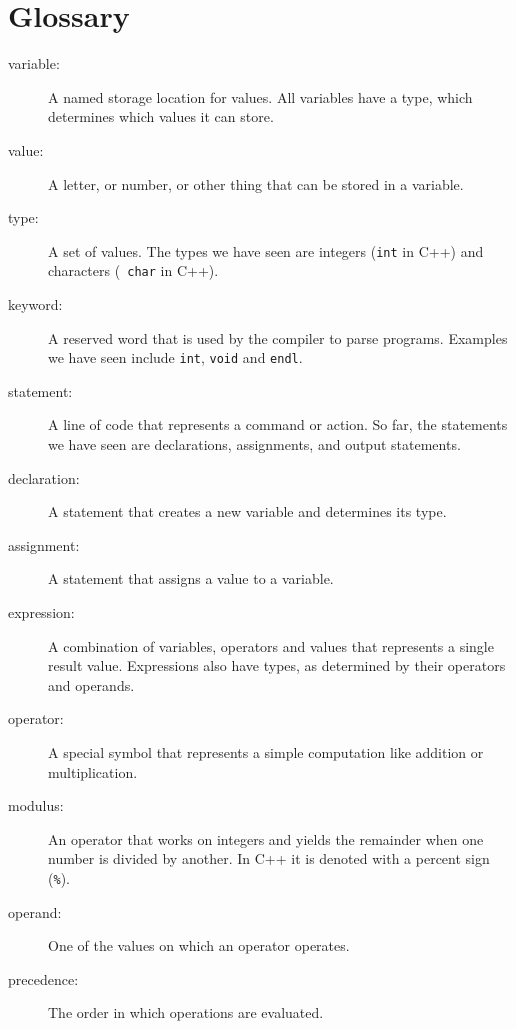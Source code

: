 \section{Glossary}
\begin{description}

\item[variable:] A named storage location for values.  All
variables have a type, which determines which values it can
store.

\item[value:] A letter, or number, or other thing that can be
stored in a variable.  

\item[type:] A set of values.  The types
we have seen are integers ({\tt int} in C++) and characters ({\tt
char} in C++).

\item[keyword:]  A reserved word that is used by the compiler
to parse programs.  Examples we have seen include {\tt int},
{\tt void} and {\tt endl}.

\item[statement:] A line of code that represents a command or
action.  So far, the statements we have seen are declarations,
assignments, and output statements.

\item[declaration:] A statement that creates a new variable and
determines its type.

\item[assignment:] A statement that assigns a value to a variable.

\item[expression:] A combination of variables, operators and
values that represents a single result value.  Expressions also
have types, as determined by their operators and operands.

\item[operator:] A special symbol that represents a simple
computation like addition or multiplication.

\item[modulus:]  An operator that works on integers and yields
the remainder when one number is divided by another.  In C++
it is denoted with a percent sign ({\tt \%}).

\item[operand:] One of the values on which an operator operates. 

\item[precedence:] The order in which operations are evaluated.


\end{description}
